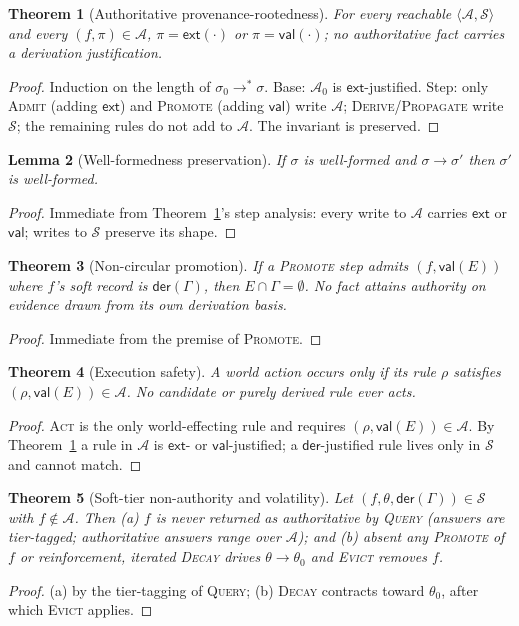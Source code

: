 \documentclass[11pt]{article}
\theoremstyle{plain}
\newtheorem{theorem}{Theorem}
\newtheorem{lemma}[theorem]{Lemma}
\theoremstyle{definition}
\newcommand{\Aut}{\mathcal{A}}
\newcommand{\Soft}{\mathcal{S}}
\newcommand{\St}{\sigma}
\newcommand{\ext}{\mathsf{ext}}
\newcommand{\der}{\mathsf{der}}
\newcommand{\val}{\mathsf{val}}
\newcommand{\reduces}{\longrightarrow}
\newcommand{\confff}{\theta}
\begin{document}
\begin{theorem}[Authoritative provenance-rootedness]
\label{thm:root}
For every reachable $\langle\Aut,\Soft\rangle$ and every $(f,\pi)\in\Aut$,
$\pi=\ext(\cdot)$ or $\pi=\val(\cdot)$; no authoritative fact carries a derivation
justification.
\end{theorem}
\begin{proof}
Induction on the length of $\St_0\reduces^{*}\St$. Base: $\Aut_0$ is
$\ext$-justified. Step: only \textsc{Admit} (adding $\ext$) and \textsc{Promote}
(adding $\val$) write $\Aut$; \textsc{Derive}/\textsc{Propagate} write $\Soft$;
the remaining rules do not add to $\Aut$. The invariant is preserved.
\end{proof}

\begin{lemma}[Well-formedness preservation]
\label{lem:wf}
If $\St$ is well-formed and $\St\reduces\St'$ then $\St'$ is well-formed.
\end{lemma}
\begin{proof}
Immediate from Theorem~\ref{thm:root}'s step analysis: every write to $\Aut$
carries $\ext$ or $\val$; writes to $\Soft$ preserve its shape.
\end{proof}

\begin{theorem}[Non-circular promotion]
\label{thm:noncirc}
If a \textsc{Promote} step admits $(f,\val(E))$ where $f$'s soft record is
$\der(\Gamma)$, then $E\cap\Gamma=\emptyset$. No fact attains authority on
evidence drawn from its own derivation basis.
\end{theorem}
\begin{proof}
Immediate from the premise of \textsc{Promote}.
\end{proof}

\begin{theorem}[Execution safety]
\label{thm:exec}
A world action occurs only if its rule $\rho$ satisfies $(\rho,\val(E))\in\Aut$.
No candidate or purely derived rule ever acts.
\end{theorem}
\begin{proof}
\textsc{Act} is the only world-effecting rule and requires $(\rho,\val(E))\in\Aut$.
By Theorem~\ref{thm:root} a rule in $\Aut$ is $\ext$- or $\val$-justified; a
$\der$-justified rule lives only in $\Soft$ and cannot match.
\end{proof}

\begin{theorem}[Soft-tier non-authority and volatility]
\label{thm:soft}
Let $(f,\confff,\der(\Gamma))\in\Soft$ with $f\notin\Aut$. Then \emph{(a)} $f$ is
never returned as authoritative by \textsc{Query} (answers are tier-tagged;
authoritative answers range over $\Aut$); and \emph{(b)} absent any
\textsc{Promote} of $f$ or reinforcement, iterated \textsc{Decay} drives
$\confff\to\confff_0$ and \textsc{Evict} removes $f$.
\end{theorem}
\begin{proof}
(a) by the tier-tagging of \textsc{Query}; (b) \textsc{Decay} contracts toward
$\confff_0$, after which \textsc{Evict} applies.
\end{proof}
\end{document}
